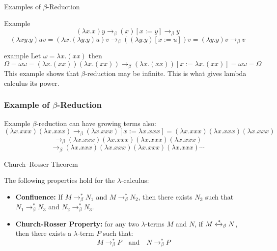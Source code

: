 \documentclass{beamer}
\begin{document}
\begin{frame}{Examples of $\beta$-Reduction}
  \begin{block}{Example}
    \[
      (\lambda x.x) y \rightarrow_\beta (x)[x := y] \rightarrow_\beta y
    \]
    \[
      (\lambda xy.y)uv = (\lambda x.(\lambda y.y)u)v \rightarrow_\beta ((\lambda y.y)[x:=u])v = (\lambda y.y)v \rightarrow_\beta v 
    \]
  \end{block}
  \begin{block}{example}
    Let \(\omega = \lambda x.(xx)\) then
    \[
      \Omega = \omega \omega = (\lambda x.(xx))(\lambda x.(xx)) \rightarrow_\beta (\lambda x.(xx))[x := \lambda x.(xx)] = \omega\omega =\Omega
    \]
    This example shows that \(\beta\)-reduction may be infinite. This is what gives lambda calculus its power.
  \end{block}
\end{frame}

\begin{frame}
  \frametitle{Example of $\beta$-Reduction}

  \begin{block}{Example}
    \(\beta\)-reduction can have growing terms also:
    \[
      (\lambda x.xxx)(\lambda x.xxx) \rightarrow_\beta (\lambda x.xxx)[x := \lambda x.xxx] = (\lambda x.xxx)(\lambda x.xxx)(\lambda x.xxx)
    \]
    \[
      \rightarrow_\beta (\lambda x.xxx)(\lambda x.xxx)(\lambda x.xxx)(\lambda x.xxx)
    \]
    \[
      \rightarrow_\beta (\lambda x.xxx)(\lambda x.xxx)(\lambda x.xxx)(\lambda x.xxx)\cdots
    \]
  \end{block}
\end{frame}

\begin{frame}{Church–Rosser Theorem}

  \begin{theorem}
    The following properties hold for the \(\lambda\)-calculus:
    \begin{itemize}
      \item \textbf{Confluence:} If \( M \rightarrow^*_\beta N_1 \) and \( M \rightarrow^*_\beta N_2 \), then there exists \( N_3 \) such that \( N_1 \rightarrow^*_\beta N_3 \) and \( N_2 \rightarrow^*_\beta N_3 \).
      
      \item \textbf{Church-Rosser Property:}
        for any two $\lambda$-terms \(M\) and \(N\), if \(M \xleftrightarrow{*}_\beta N\), then there exists a $\lambda$-term \(P\) such that:
        \[
          M \rightarrow^{*}_\beta P \quad \text{and} \quad N \rightarrow^{*}_\beta P
        \]
    \end{itemize}
  \end{theorem}
\end{frame}
\end{document}
